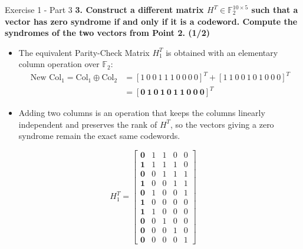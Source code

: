 \documentclass[10pt, aspectratio=169]{beamer}
\newcommand{\question}[1]{{\color{QuestionRed}\textbf{#1}}}
\begin{document}
\begin{frame}{Exercise 1 - Part 3}
	\question{3. Construct a different matrix $H^T \in \mathbb{F}_2^{10 \times 5}$ such that a vector has zero syndrome if and only if it is a codeword. Compute the syndromes of the two vectors from Point 2. (1/2)}
	
	\vspace{0.1cm}
	\begin{itemize}
		\item The equivalent Parity-Check Matrix $H_1^T$ is obtained with an elementary column operation over $\mathbb{F}_2$:
		{\small
			\[
			\begin{aligned}
				\text{New Col}_1 = \text{Col}_1 \oplus \text{Col}_2 &= [1\ 0\ 0\ 1\ 1\ 1\ 0\ 0\ 0\ 0]^T + [1\ 1\ 0\ 0\ 1\ 0\ 1\ 0\ 0\ 0]^T \\
				&= [\mathbf{0\ 1\ 0\ 1\ 0\ 1\ 1\ 0\ 0\ 0}]^T
			\end{aligned}
			\]
		}
		\item Adding two columns is an operation that keeps the columns linearly independent and preserves the rank of $H^T$, so the vectors giving a zero syndrome remain the exact same codewords.
	\end{itemize}
	{\footnotesize
		\renewcommand{\arraystretch}{0.84}
		\[
		H_1^T = \begin{bmatrix}
			\mathbf{0} & 1 & 1 & 0 & 0 \\
			\mathbf{1} & 1 & 1 & 1 & 0 \\
			\mathbf{0} & 0 & 1 & 1 & 1 \\
			\mathbf{1} & 0 & 0 & 1 & 1 \\
			\mathbf{0} & 1 & 0 & 0 & 1 \\
			\mathbf{1} & 0 & 0 & 0 & 0 \\
			\mathbf{1} & 1 & 0 & 0 & 0 \\
			\mathbf{0} & 0 & 1 & 0 & 0 \\
			\mathbf{0} & 0 & 0 & 1 & 0 \\
			\mathbf{0} & 0 & 0 & 0 & 1
		\end{bmatrix}
		\]
	}
\end{frame}
\end{document}
